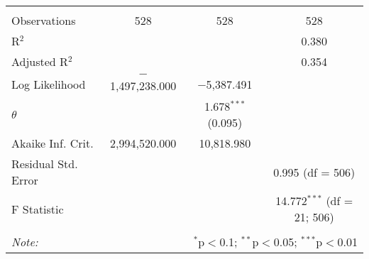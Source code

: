 \begin{table}[!htbp]
\begin{tabular}{@{\extracolsep{5pt}}lccc}
 \hline \\[-1.8ex] 
Observations & 528 & 528 & 528 \\ 
R$^{2}$ &  &  & 0.380 \\ 
Adjusted R$^{2}$ &  &  & 0.354 \\ 
Log Likelihood & $-$1,497,238.000 & $-$5,387.491 &  \\ 
$\theta$ &  & 1.678$^{***}$  (0.095) &  \\ 
Akaike Inf. Crit. & 2,994,520.000 & 10,818.980 &  \\ 
Residual Std. Error &  &  & 0.995 (df = 506) \\ 
F Statistic &  &  & 14.772$^{***}$ (df = 21; 506) \\ 
\hline 
\hline \\[-1.8ex] 
\textit{Note:}  & \multicolumn{3}{r}{$^{*}$p$<$0.1; $^{**}$p$<$0.05; $^{***}$p$<$0.01} \\ 
\end{tabular} 
\end{table} 
